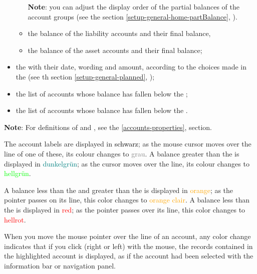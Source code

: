 \begin{itemize}
\begin{itemize}
			 \textbf{Note}: you can adjust the display order of the partial balances of the account groups (see the section \vref{setup-general-home-partBalance}, ).			 
			 \item the balance of the liability accounts and their final balance,
			 \item the balance of the asset accounts and their final balance;
		\end{itemize}
	\item the  with their date, wording and amount, according to the choices made in the  (see th section \vref{setup-general-planned}, );
	\item the list of accounts whose balance has fallen below the  ;
	\item the list of accounts whose balance has fallen below the  .
\end{itemize}


\textbf{Note}: For definitions of  and , see the \vref{accounts-properties},  section.


The account labels are displayed in \textcolor{black}{schwarz}; as the mouse cursor moves over the line of one of these, its colour changes to \textcolor{gray}{grau}.
A balance greater than the    is displayed in \textcolor{teal}{dunkelgrün}; as the cursor moves over the line, its colour changes to \textcolor{lime}{hellgrün}.

A balance less than the  and greater than the  is displayed in \textcolor{orange}{orange}; as the pointer passes on its line, this color changes to \textcolor{orange}{orange clair}.
A balance less than the    is displayed in \textcolor{red}{red}; as the pointer passes over its line, this color changes to \textcolor{red}{hellrot}.

When you move the mouse pointer over the line of an account, any color change indicates that if you click (right or left) with the mouse, the records contained in the highlighted account is displayed, as if the account had been selected with the information bar or navigation panel.

